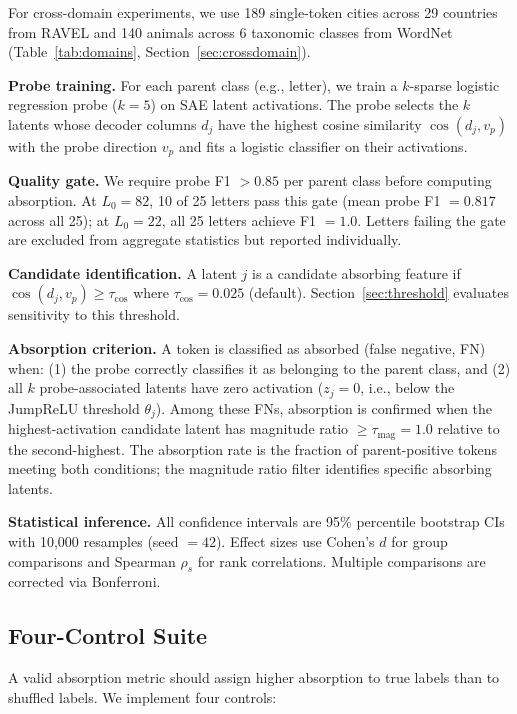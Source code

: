 \documentclass{article}
\begin{document}
For cross-domain experiments, we use 189 single-token cities across 29 countries from RAVEL \citep{huang2024ravel} and 140 animals across 6 taxonomic classes from WordNet (Table~\ref{tab:domains}, Section~\ref{sec:crossdomain}).

\textbf{Probe training.} For each parent class (e.g., letter), we train a $k$-sparse logistic regression probe ($k = 5$) on SAE latent activations. The probe selects the $k$ latents whose decoder columns $d_j$ have the highest cosine similarity $\cos(d_j, v_p)$ with the probe direction $v_p$ and fits a logistic classifier on their activations.

\textbf{Quality gate.} We require probe F1 $> 0.85$ per parent class before computing absorption. At $L_0 = 82$, 10 of 25 letters pass this gate (mean probe F1 $= 0.817$ across all 25); at $L_0 = 22$, all 25 letters achieve F1 $= 1.0$. Letters failing the gate are excluded from aggregate statistics but reported individually.

\textbf{Candidate identification.} A latent $j$ is a candidate absorbing feature if $\cos(d_j, v_p) \geq \tau_{\cos}$ where $\tau_{\cos} = 0.025$ (default). Section~\ref{sec:threshold} evaluates sensitivity to this threshold.

\textbf{Absorption criterion.} A token is classified as absorbed (false negative, FN) when: (1) the probe correctly classifies it as belonging to the parent class, and (2) all $k$ probe-associated latents have zero activation ($z_j = 0$, i.e., below the JumpReLU threshold $\theta_j$). Among these FNs, absorption is confirmed when the highest-activation candidate latent has magnitude ratio $\geq \tau_{\text{mag}} = 1.0$ relative to the second-highest. The absorption rate is the fraction of parent-positive tokens meeting both conditions; the magnitude ratio filter identifies specific absorbing latents.

\textbf{Statistical inference.} All confidence intervals are 95\% percentile bootstrap CIs with 10,000 resamples (seed $= 42$). Effect sizes use Cohen's $d$ for group comparisons and Spearman $\rho_s$ for rank correlations. Multiple comparisons are corrected via Bonferroni.

\subsection{Four-Control Suite}

A valid absorption metric should assign higher absorption to true labels than to shuffled labels. We implement four controls:
\end{document}
